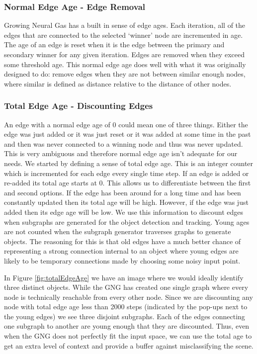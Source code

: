 \documentclass{article}
\renewcommand{\|}{\origbar} %
\begin{document}
\subsubsection{Normal Edge Age - Edge Removal}

Growing Neural Gas has a built in sense of edge ages. Each iteration, all of the edges that are connected to the selected `winner' node are incremented in age. The age of an edge is reset when it is the edge between the primary and secondary winner for any given iteration. Edges are removed when they exceed some threshold age. This normal edge age does well with what it was originally designed to do: remove edges when they are not between similar enough nodes, where similar is defined as distance relative to the distance of other nodes.

\subsubsection{Total Edge Age - Discounting Edges}

An edge with a normal edge age of 0 could mean one of three things. Either the edge was just added or it was just reset or it was added at some time in the past and then was never connected to a winning node and thus was never updated. This is very ambiguous and therefore normal edge age isn't adequate for our needs. We started by defining a sense of total edge age. This is an integer counter which is incremented for each edge every single time step. If an edge is added or re-added its total age starts at 0. This allows us to differentiate between the first and second options. If the edge has been around for a long time and has been constantly updated then its total age will be high. However, if the edge was just added then its edge age will be low. We use this information to discount edges when subgraphs are generated for the object detection and tracking. Young ages are not counted when the subgraph generator traverses graphs to generate objects. The reasoning for this is that old edges have a much better chance of representing a strong connection internal to an object where young edges are likely to be temporary connections made by choosing some noisy input point. 

In Figure \ref{fig:totalEdgeAge} we have an image where we would ideally identify three distinct objects. While the GNG has created one single graph where every node is technically reachable from every other node. Since we are discounting any node with total edge age less than 2000 steps (indicated by the pop-ups next to the young edges) we see three disjoint subgraphs. Each of the edges connecting one subgraph to another are young enough that they are discounted. Thus, even when the GNG does not perfectly fit the input space, we can use the total age to get an extra level of context and provide a buffer against misclassifying the scene.
\end{document}
